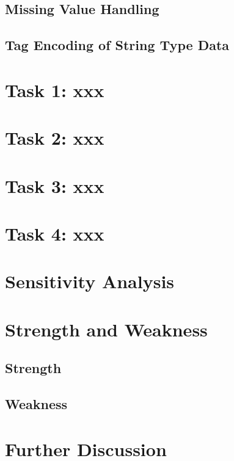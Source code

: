 \documentclass{mcmthesis}
\begin{document}
\subsection{Missing Value Handling}
\subsection{Tag Encoding of String Type Data}


\section{Task 1: xxx}

\section{Task 2: xxx}

\section{Task 3: xxx}

\section{Task 4: xxx}

\section{Sensitivity Analysis}

\section{Strength and Weakness}
\subsection{Strength}
\subsection{Weakness}

\section{Further Discussion}



\newpage
\end{document}
